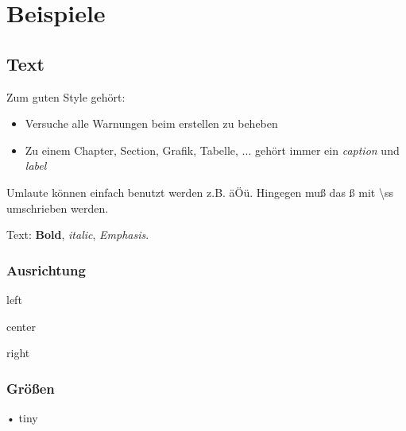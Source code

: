 
\chapter{Beispiele}\label{cha:beispiele}

\blindtext


\section{Text}\label{sec:text}

Zum guten Style gehört:
\begin{itemize}
	\item Versuche alle Warnungen beim erstellen zu beheben
	\item Zu einem Chapter, Section, Grafik, Tabelle, ... gehört immer ein \textit{caption} und \textit{label}
\end{itemize}

Umlaute können einfach benutzt werden z.B. äÖü. Hingegen mu{\ss} das {\ss} mit \textbackslash ss umschrieben werden.\par

Text: \textbf{Bold}, \textit{italic}, \emph{Emphasis}.\par

\subsection{Ausrichtung}\label{ssec:ausrichtung}

\begin{flushleft}
left
\end{flushleft}

\begin{center}
center
\end{center}

\begin{flushright}
right
\end{flushright}

\subsection{Grö{\ss}en}\label{ssec:groessen}

\begin{tiny}
• tiny
\end{tiny}

